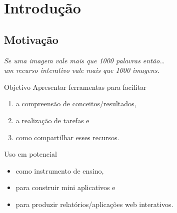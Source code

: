 \section{Introdução}

\subsection{Motivação}

\begin{frame}

  \begin{minipage}[c]{0.8\linewidth}
    \begin{center}
      \it Se uma imagem vale mais que 1000 palavras então\ldots
      \pause~\\
      um recurso interativo vale mais que 1000 imagens.
    \end{center}
  \end{minipage}
  \vspace{2em}

  \begin{multicols}{2}
    \pause
    \begin{block}{Objetivo}
      Apresentar ferramentas para facilitar
      \begin{enumerate}
        \itemsep-2pt\parskip0pt
      \item a compreensão de conceitos/resultados,
      \item a realização de tarefas e
      \item como compartilhar esses recursos.
      \end{enumerate}
    \end{block}
    \vfill \columnbreak \pause
    \begin{block}{Uso em potencial}
      \begin{itemize}
      \item como instrumento de ensino,
      \item para construir mini aplicativos e
      \item para produzir relatórios/aplicações web interativos.
      \end{itemize}
    \end{block}
  \end{multicols}
\end{frame}

